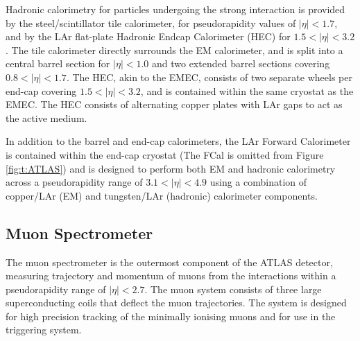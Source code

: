 		Hadronic calorimetry for particles undergoing the strong interaction is provided by the steel/scintillator tile calorimeter, for pseudorapidity values of $|\eta|<1.7$, and by the LAr flat-plate Hadronic Endcap Calorimeter (HEC) for $1.5<|\eta|<3.2$. The tile calorimeter directly surrounds the EM calorimeter, and is split into a central barrel section for $|\eta| < 1.0$ and two extended barrel sections covering $0.8<|\eta|<1.7$. The HEC, akin to the EMEC, consists of two separate wheels per end-cap covering $1.5<|\eta|<3.2$, and is contained within the same cryostat as the EMEC. The HEC consists of alternating copper plates with LAr gaps to act as the active medium.

		In addition to the barrel and end-cap calorimeters, the LAr Forward Calorimeter is contained within the end-cap cryostat (The FCal is omitted from Figure \ref{fig:t:ATLAS}) and is designed to perform both EM and hadronic calorimetry across a pseudorapidity range of $3.1<|\eta|<4.9$ using a combination of copper/LAr (EM) and tungsten/LAr (hadronic) calorimeter components.

	\subsection{Muon Spectrometer}

		The muon spectrometer is the outermost component of the ATLAS detector, measuring trajectory and momentum of muons from the interactions within a pseudorapidity range of $|\eta| < 2.7$. The muon system consists of three large superconducting coils that deflect the muon trajectories. The system is designed for high precision tracking of the minimally ionising muons and for use in the triggering system.



